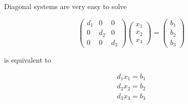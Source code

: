 \begin{frame}
    
    \vspace{2em}
    Diagonal systems are very easy to solve

    \vspace{0.5em}

    \Eg

    \begin{equation*}
        \begin{pmatrix}
            d_1 & 0  & 0 \\
            0 & d_2 & 0 \\
            0 & 0 & d_3 
        \end{pmatrix}
        \begin{pmatrix}
            x_1  \\
            x_2  \\
            x_3 
        \end{pmatrix}
        =
        \begin{pmatrix}
            b_1  \\
            b_2  \\
            b_3 
        \end{pmatrix}
    \end{equation*}

    is equivalent to

    \begin{equation*}
        \begin{array}{c}
            d_1 x_1  = b_1  \\
            d_2x_2 = b_2 \\
            d_3 x_3 = b_3
        \end{array}
    \end{equation*}

\end{frame}

